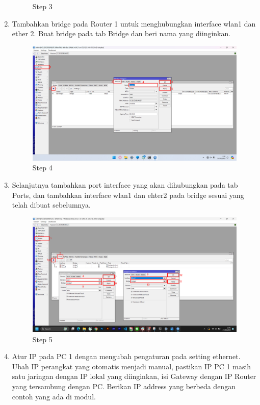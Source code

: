 \begin{center}
\begin{enumerate}
\begin{figure}[H]
			\caption{Step 3}
			\label{fig:Step 3(Per.3 PC1)}
		\end{figure}
		\item Tambahkan bridge pada Router 1 untuk menghubungkan interface wlan1 dan ether 2. Buat bridge pada tab Bridge dan beri nama yang diinginkan.
		\begin{figure}[H]
			\centering
			\includegraphics[width=0.9\linewidth]{P1/img/per3/pc1/Step 4.png}
			\caption{Step 4}
			\label{fig:Step 4(Per.3 PC1)}
		\end{figure}
		\item Selanjutnya tambahkan port interface yang akan dihubungkan pada tab Ports, dan tambahkan interface wlan1 dan ehter2 pada bridge sesuai yang telah dibuat sebelumnya.
		\begin{figure}[H]
			\centering
			\includegraphics[width=0.9\linewidth]{P1/img/per3/pc1/Step 5.png}
			\caption{Step 5}
			\label{fig:Step 5(Per.3 PC1)}
		\end{figure}
		\item Atur IP pada PC 1 dengan mengubah pengaturan pada setting ethernet. Ubah IP perangkat yang otomatis menjadi manual, pastikan IP PC 1 masih satu jaringan dengan IP lokal yang diinginkan, isi Gateway dengan IP Router yang tersambung dengan PC. Berikan IP address yang berbeda dengan contoh yang ada di modul.

\end{enumerate}
\end{center}
